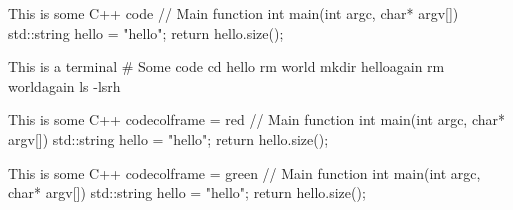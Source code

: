 \documentclass[letterpaper, 10pt]{article}
\begin{document}
\begin{cppbox}[\footnotesize]{This is some C++ code}{}{}
// Main function
int main(int argc, char* argv[])
{
    std::string hello = "hello";
    return hello.size();
}
\end{cppbox}

\begin{bashframe}[\footnotesize]{This is a terminal}{}{}
# Some code
cd hello
rm world
mkdir helloagain
rm worldagain
ls -lsrh
\end{bashframe}

\noindent
\begin{minipage}[t]{0.49\textwidth}
\begin{cppbox}[\tiny]{This is some C++ code}{}{colframe = red}
// Main function
int main(int argc, char* argv[])
{
    std::string hello = "hello";
    return hello.size();
}
\end{cppbox}
\end{minipage}\hfill\begin{minipage}[t]{0.49\textwidth}
\begin{cppbox}[\tiny]{This is some C++ code}{}{colframe = green}
// Main function
int main(int argc, char* argv[])
{
    std::string hello = "hello";
    return hello.size();
}
\end{cppbox}
\end{minipage}
\end{document}
